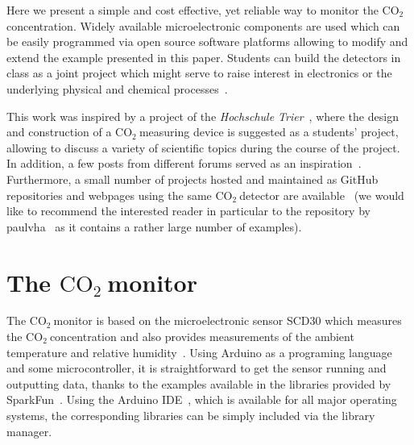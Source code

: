 \documentclass[12pt,a4paper]{article}
\newcommand{\coo}{\ensuremath{\mathrm{CO_2}~}}
\begin{document}
Here we present a simple and cost effective, yet reliable way to monitor the \coo concentration. Widely available microelectronic components are used which can be easily programmed via open source software platforms allowing to modify and extend the example presented in this paper. Students can build the detectors in class as a joint project which might serve to raise interest in electronics or the underlying physical and chemical processes~\cite{WATZKA2011}. 

This work was inspired by a project of the \textit{Hochschule Trier}~\cite{BIRKENFELD2020}, where the design and construction of a \coo measuring device is suggested as a students' project, allowing to discuss a variety of scientific topics during the course of the project. In addition, a few posts from different forums served as an inspiration~\cite{BOYLES2020,METROPOL2020,OMBRA2020,ZENTRIS2020}. Furthermore, a small number of projects hosted and maintained as GitHub repositories and webpages using the same \coo detector are available~\cite{MKETZ2020,NETZBASTELN2020,PAULVHA2020,RUHE2020} (we would like to recommend the interested reader in particular to the repository by paulvha~\cite{PAULVHA2020} as it contains a rather large number of examples).


\section{The \coo monitor}
The \coo monitor is based on the microelectronic sensor SCD30 which measures the \coo concentration and also provides measurements of the ambient temperature and relative humidity~\cite{SENSIRION2020B}. Using Arduino as a programing language and some microcontroller, it is straightforward to get the sensor running and outputting data, thanks to the examples available in the libraries provided by SparkFun~\cite{SPARKFUN2020}. Using the Arduino IDE~\cite{ARDUINOIDE2020}, which is available for all major operating systems, the corresponding libraries can be simply included via the library manager. 
\end{document}
